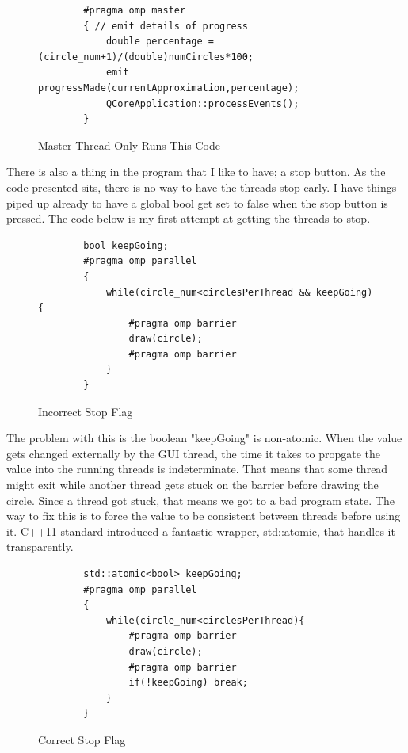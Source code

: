 \documentclass[12pt]{article}
\begin{document}
\begin{figure}[htb]
	\centering
	\begin{verbatim}
		#pragma omp master
		{ // emit details of progress
			double percentage = (circle_num+1)/(double)numCircles*100;
			emit progressMade(currentApproximation,percentage);
			QCoreApplication::processEvents();
		}
	\end{verbatim}
	\caption{Master Thread Only Runs This Code}
\end{figure}

There is also a thing in the program that I like to have; a stop button.
As the code presented sits, there is no way to have the threads stop early.
I have things piped up already to have a global bool get set to false when the stop button is pressed.
The code below is my first attempt at getting the threads to stop.

\begin{figure}[htb]
	\centering
	\begin{verbatim}
		bool keepGoing;
		#pragma omp parallel
		{
			while(circle_num<circlesPerThread && keepGoing){
				#pragma omp barrier
				draw(circle);
				#pragma omp barrier
			}
		}
	\end{verbatim}
	\caption{Incorrect Stop Flag}
\end{figure}

The problem with this is the boolean "keepGoing" is non-atomic.
When the value gets changed externally by the GUI thread, the time it takes to propgate the value into the running threads is indeterminate.
That means that some thread might exit while another thread gets stuck on the barrier before drawing the circle.
Since a thread got stuck, that means we got to a bad program state.
The way to fix this is to force the value to be consistent between threads before using it.
C++11 standard introduced a fantastic wrapper, std::atomic, that handles it transparently.

\begin{figure}[htb]
	\centering
	\begin{verbatim}
		std::atomic<bool> keepGoing;
		#pragma omp parallel
		{
			while(circle_num<circlesPerThread){
				#pragma omp barrier
				draw(circle);
				#pragma omp barrier
				if(!keepGoing) break;
			}
		}
	\end{verbatim}
	\caption{Correct Stop Flag}
\end{figure}
\end{document}
